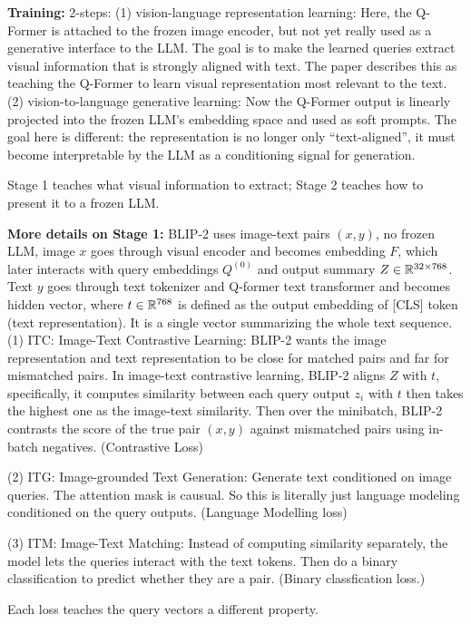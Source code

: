 \documentclass[11pt]{article}  %
\begin{document}
\begin{itemize}
\begin{enumerate}
    \textbf{Training:} 2-steps: (1) vision-language representation learning: Here, the Q-Former is attached to the frozen image encoder, but not yet really used as a generative interface to the LLM. The goal is to make the learned queries extract visual information that is strongly aligned with text. The paper describes this as teaching the Q-Former to learn visual representation most relevant to the text.
    (2) vision-to-language generative learning: Now the Q-Former output is linearly projected into the frozen LLM's embedding space and used as soft prompts. The goal here is different: the representation is no longer only ``text-aligned'', it must become interpretable by the LLM as a conditioning signal for generation.

    Stage 1 teaches what visual information to extract; Stage 2 teaches how to present it to a frozen LLM.

    \textbf{More details on Stage 1:} BLIP-2 uses image-text pairs $(x, y)$, no frozen LLM, image $x$ goes through visual encoder and becomes embedding $F$, which later interacts with query embeddings $Q^{(0)}$ and output summary $Z \in \mathbb{R}^{32 \times 768}$.
    Text $y$ goes through text tokenizer and Q-former text transformer and becomes hidden vector, where $t \in \mathbb{R}^{768}$ is defined as the output embedding of [CLS] token (text representation). 
    It is a single vector summarizing the whole text sequence.
    (1) ITC: Image-Text Contrastive Learning: BLIP-2 wants the image representation and text representation to be close for matched pairs and far for mismatched pairs.
    In image-text contrastive learning, BLIP-2 aligns $Z$ with $t$, specifically, it computes similarity between each query output $z_i$ with $t$ then takes the highest one as the image-text similarity.
    Then over the minibatch, BLIP-2 contrasts the score of the true pair $(x, y)$ against mismatched pairs using in-batch negatives. (Contrastive Loss)

    (2) ITG: Image-grounded Text Generation: Generate text conditioned on image queries. The attention mask is causual.
    So this is literally just language modeling conditioned on the query outputs. (Language Modelling loss)

    (3) ITM: Image-Text Matching: Instead of computing similarity separately, the model lets the queries interact with the text tokens. Then do a binary classification to predict whether they are a pair. (Binary classfication loss.)

    Each loss teaches the query vectors a different property.
  


\end{enumerate}
\end{itemize}
\end{document}
